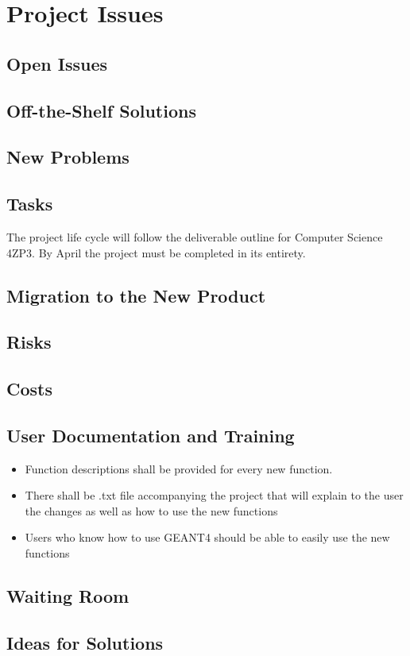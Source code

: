\documentclass[12pt]{article}
\begin{document}
\section{Project Issues}
\subsection{Open Issues} %
\subsection{Off-the-Shelf Solutions} %
\subsection{New Problems} %
\subsection{Tasks} %
The project life cycle will follow the deliverable outline for Computer Science 4ZP3. By April the project must be completed in its entirety. 
\subsection{Migration to the New Product} %
\subsection{Risks} %
\subsection{Costs} %
\subsection{User Documentation and Training} %
\begin{itemize}
	\item Function descriptions shall be provided for every new function. 
	\item There shall be .txt file accompanying the project that will explain to the user the changes as well as how to use the new functions
	\item Users who know how to use GEANT4 should be able to easily use the new functions
\end{itemize}
\subsection{Waiting Room} %
\subsection{Ideas for Solutions} %
\end{document}
